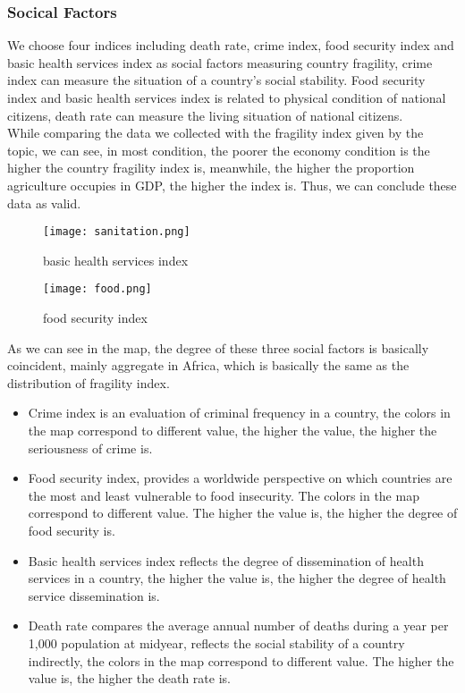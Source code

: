 \documentclass{mcmthesis}
\begin{document}
\subsubsection{Socical Factors}
We choose four indices including death rate, crime index, food security index and basic health services index as social factors measuring country fragility, crime index can measure the situation of a country's social stability. Food security index and basic health services index is related to physical condition of national citizens, death rate can measure the living situation of national citizens.\\
While comparing the data we collected with the fragility index given by the topic, we can see, in most condition, the poorer the economy condition is the higher the country fragility index is, meanwhile, the higher the proportion agriculture occupies in GDP, the higher the index is. Thus, we can conclude these data as valid.
\begin{figure}[h]
  \centering
  \begin{minipage}[h]{0.48\textwidth}
  \centering
  \texttt{[image: sanitation.png]}
  \caption{basic health services index}
  \end{minipage}
  \begin{minipage}[h]{0.48\textwidth}
  \centering
  \texttt{[image: food.png]}
  \caption{food security index}
  \end{minipage}
\end{figure}
As we can see in the map, the degree of these three social factors is basically coincident, mainly aggregate in Africa, which is basically the same as the distribution of fragility index.
\begin{itemize}
  \item Crime index is an evaluation of criminal frequency in a country, the colors in the map correspond to different value, the higher the value, the higher the seriousness of crime is.
  \item Food security index, provides a worldwide perspective on which countries are the most and least vulnerable to food insecurity. The colors in the map correspond to different value. The higher the value is, the higher the degree of food security is.
  \item Basic health services index reflects the degree of dissemination of health services in a country, the higher the value is, the higher the degree of health service dissemination is.
  \item Death rate compares the average annual number of deaths during a year per 1,000 population at midyear, reflects the social stability of a country indirectly, the colors in the map correspond to different value. The higher the value is, the higher the death rate is.
\end{itemize}
\newpage
\end{document}
